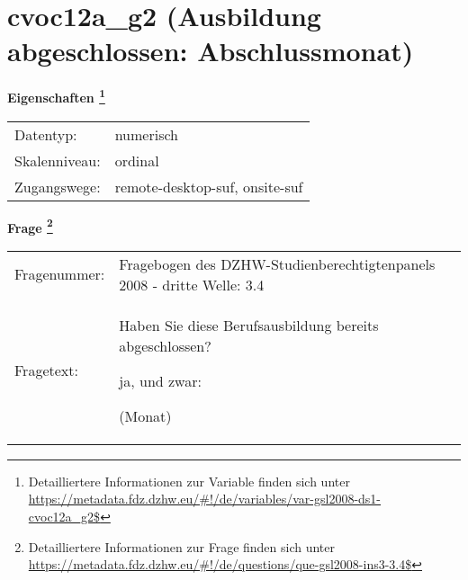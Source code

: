 
    \setcounter{footnote}{0}

    \vspace*{-1.8cm}
	\section{cvoc12a\_g2 (Ausbildung abgeschlossen: Abschlussmonat)}
	\label{section:cvoc12a_g2}



    \vspace*{0.5cm}
    \noindent\textbf{Eigenschaften
	\footnote{Detailliertere Informationen zur Variable finden sich unter
		\url{https://metadata.fdz.dzhw.eu/\#!/de/variables/var-gsl2008-ds1-cvoc12a_g2$}}}\\
	\begin{tabularx}{\hsize}{@{}lX}
	Datentyp: & numerisch \\
	Skalenniveau: & ordinal \\
	Zugangswege: &
	  remote-desktop-suf, 
	  onsite-suf
 \\
    \end{tabularx}



				\vspace*{0.5cm}
                \noindent\textbf{Frage
	                \footnote{Detailliertere Informationen zur Frage finden sich unter
		              \url{https://metadata.fdz.dzhw.eu/\#!/de/questions/que-gsl2008-ins3-3.4$}}}\\
				\begin{tabularx}{\hsize}{@{}lX}
					Fragenummer: &
					  Fragebogen des DZHW-Studienberechtigtenpanels 2008 - dritte Welle:
					  3.4
 \\
					Fragetext: & Haben Sie diese Berufsausbildung bereits abgeschlossen?\par  ja, und zwar:\par  (Monat) \\
				\end{tabularx}






